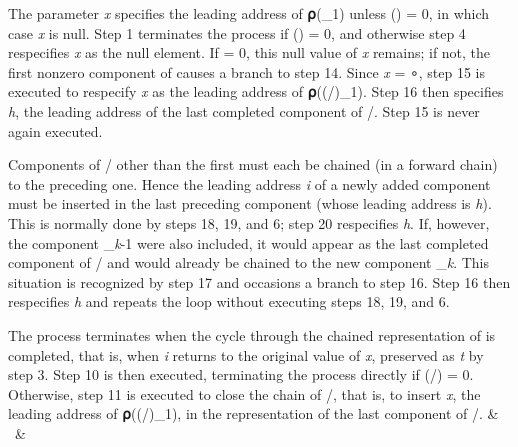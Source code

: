 {\begin{tabularx}
\par The parameter \textit{x} specifies the leading address of \textbf{⍴}(_{1}) unless \textit{\nu}() = 0, in which case \textit{x} is null. Step 1 terminates the process if \textit{\nu}() = 0, and otherwise step 4 respecifies \textit{x} as the null element. If  = 0, this null value of \textit{x} remains; if not, the first nonzero component of  causes a branch to step 14. Since \textit{x} = ∘, step 15 is executed to respecify \textit{x} as the leading address of \textbf{⍴}((/)_{1}). Step 16 then specifies \textit{h}, the leading address of the last completed component of /. Step 15 is never again executed.

\par Components of / other than the first must each be chained (in a forward chain) to the preceding one. Hence the leading address \textit{i} of a newly added component must be inserted in the last preceding component (whose leading address is \textit{h}). This is normally done by steps 18, 19, and 6; step 20 respecifies \textit{h}. If, however, the component 
_{\textit{k}-1} were also included, it would appear as the last completed component of / and would already be chained to the new component 
_{\textit{k}}. This situation is recognized by step 17 and occasions a branch to step 16. Step 16 then respecifies \textit{h} and repeats the loop without executing steps 18, 19, and 6.

\par The process terminates when the cycle through the chained representation of  is completed, that is, when \textit{i} returns to the original value of \textit{x}, preserved as \textit{t} by step 3. Step 10 is then executed, terminating the process directly if 
\textit{\nu}(/) = 0. Otherwise, step 11 is executed to close the chain of /, that is, to insert \textit{x}, the leading address of \textbf{⍴}((/)_{1}), in the representation of the last component of /.
 & \ & \\\end{tabularx}

}

